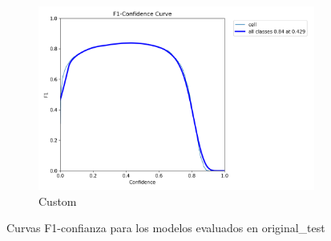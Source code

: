 \documentclass[12pt,a4paper,onecolumn,oneside]{report}
\begin{document}
\begin{figure}[H]
  \vspace{0.0cm}
  \begin{subfigure}[b]{0.48\textwidth}
    \centering
    \includegraphics[width=\textwidth]{figuras/resultados experimentacion/custom/original_test/BoxF1_curve.png}
    \caption{Custom}
    \label{fig:custom_original_test}
  \end{subfigure}
  
  \caption{Curvas F1-confianza para los modelos evaluados en original\_test}
  \label{fig:f1_curves_original_test}
\end{figure}
\end{document}
